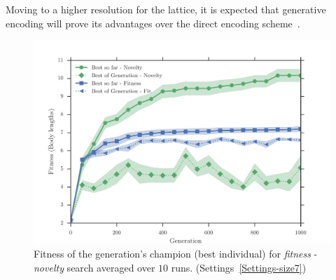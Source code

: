 Moving to a higher resolution for the lattice, it is expected that generative encoding will prove its advantages over the direct encoding scheme~\citep{cheney2013unshackling,stanley2007compositional}. 
\begin{figure}[t!]
\centering
\includegraphics[width=1.0\textwidth]{../Figures/Results/AvgGenerChampNoveltyFitnessSize7.pdf}
\caption{Fitness of the generation's champion (best individual) for \emph{fitness} - \emph{novelty} search averaged over $10$ runs. (Settings~\ref{Settings-size7})}
\label{fig:AvgGenerChampNoveltyFitnessSize7}
\end{figure}
